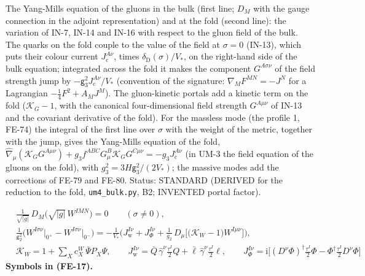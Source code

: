 \documentclass[
  10pt,
]{article}
\begin{document}
The Yang-Mills equation of the gluons in the bulk (first line; \(D_M\)
with the gauge connection in the adjoint representation) and at the fold
(second line): the variation of IN-7, IN-14 and IN-16 with respect to
the gluon field of the bulk. The quarks on the fold couple to the value
of the field at \(\sigma = 0\) (IN-13), which puts their colour current
\(J_{\mathrm{c}}^{A\nu}\), times \(\delta_{\mathrm{D}}(\sigma)/V_*\), on
the right-hand side of the bulk equation; integrated across the fold it
makes the component \(G^{A\sigma\nu}\) of the field strength jump by
\(-\mathsf{g}_3^2J_{\mathrm{c}}^{A\nu}/V_*\) (convention of the
signature: \(\nabla_M F^{MN} = -J^N\) for a Lagrangian
\(-\frac14F^2 + A_MJ^M\)). The gluon-kinetic portals add a kinetic term
on the fold (\(\mathcal{K}_{G} - 1\), with the canonical
four-dimensional field strength \(G^{A\mu\nu}\) of IN-13 and the
covariant derivative of the fold). For the massless mode (the profile 1,
FE-74) the integral of the first line over \(\sigma\) with the weight of
the metric, together with the jump, gives the Yang-Mills equation of the
fold,
\(\hat\nabla_\mu(\mathcal{K}_{G}G^{A\mu\nu}) + g_3f^{ABC}G^B_\mu\mathcal{K}_{G}G^{C\mu\nu} = -g_3J_{\mathrm{c}}^{A\nu}\)
(in UM-3 the field equation of the gluons on the fold), with
\(g_3^2 = 3H\mathsf{g}_3^2/(2V_*)\); the massive modes add the
corrections of FE-79 and FE-80. Status: STANDARD (DERIVED for the
reduction to the fold, \texttt{um4\_bulk.py}, B2; INVENTED portal
factor).

\[
\begin{aligned}
&\frac{1}{\sqrt{\lvert g\rvert}}\,D_M\big(\sqrt{\lvert g\rvert}\,W^{IMN}\big) = 0\qquad (\sigma \ne 0),\\
&\frac{1}{\mathsf{g}_2^2}\Big(W^{I\sigma\nu}\big\vert_{0^+} - W^{I\sigma\nu}\big\vert_{0^-}\Big)
 = -\frac{1}{V_*}\Big(J_{\mathrm{w}}^{I\nu} + J_\Phi^{I\nu} + \frac{1}{g_2}\,D_\mu\big[\big(\mathcal{K}_{W} - 1\big)W^{I\mu\nu}\big]\Big),\\
&\mathcal{K}_{W} = 1 + \sum_X c^{W}_X\,\bar\Psi P_X\Psi,\qquad J_{\mathrm{w}}^{I\nu} = \bar Q\,\hat\gamma^\nu\frac{\tau^I}{2}Q + \bar\ell\,\hat\gamma^\nu\frac{\tau^I}{2}\ell,\qquad
 J_\Phi^{I\nu} = \mathrm{i}\Big[(D^\nu\Phi)^\dagger\frac{\tau^I}{2}\Phi - \Phi^\dagger\frac{\tau^I}{2}D^\nu\Phi\Big]
\end{aligned} \tag{FE-17}
\] \textbf{Symbols in (FE-17).}
\end{document}

